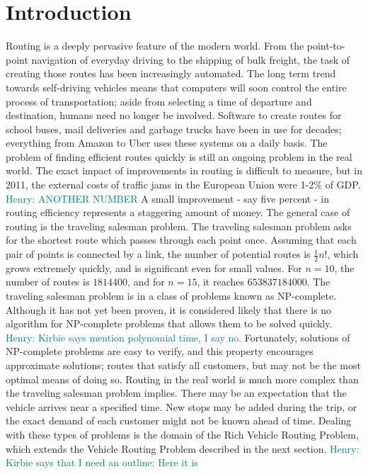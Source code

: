 \documentclass{sig-alternate}
\newcommand{\allcomments}[1]{{#1}}
\newcommand{\hfcomment}[1]{\textcolor{Teal}{\allcomments{Henry: {#1}}}}
\begin{document}
\section{Introduction}
\label{sec:intro}
Routing is a deeply pervasive feature of the modern world. From the point-to-point navigation of everyday driving to the shipping of bulk freight, the task of creating those routes has been increasingly automated. The long term trend towards self-driving vehicles means that computers will soon control the entire process of transportation; aside from selecting a time of departure and destination, humans need no longer be involved. Software to create routes for school buses, mail deliveries and garbage trucks have been in use for decades; everything from Amazon to Uber uses these systems on a daily basis. The problem of finding efficient routes quickly is still an ongoing problem in the real world. The exact impact of improvements in routing is difficult to measure, but in 2011, the external costs of traffic jams in the European Union were 1-2\% of GDP\cite{Caceres-Cruz:2014}. \hfcomment{ANOTHER NUMBER}
A small improvement - say five percent - in routing efficiency represents a staggering amount of money. The general case of routing is the traveling salesman problem. The traveling salesman problem asks for the shortest route which passes through each point once. Assuming that each pair of points is connected by a link, the number of potential routes is $\tfrac{1}{2}n!$, which grows extremely quickly, and is significant even for small values. For $n=10$, the number of routes is $1814400$, and for $n=15$, it reaches $653837184000$. The traveling salesman problem is in a class of problems known as NP-complete. Although it has not yet been proven, it is considered likely that there is no algorithm for NP-complete problems that allows them to be solved quickly. \hfcomment{Kirbie says mention polynomial time, I say no.} Fortunately, solutions of NP-complete problems are easy to verify, and this property encourages approximate solutions; routes that satisfy all customers, but may not be the most optimal means of doing so. 
Routing in the real world is much more complex than the traveling salesman problem implies. There may be an expectation that the vehicle arrives near a specified time. New stops may be added during the trip, or the exact demand of each customer might not be known ahead of time. Dealing with these types of problems is the domain of the Rich Vehicle Routing Problem, which extends the Vehicle Routing Problem described in the next section.
\hfcomment{Kirbie says that I need an outline: Here it is}
\end{document}
